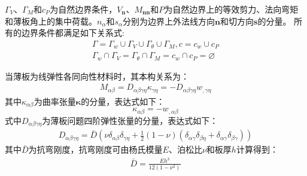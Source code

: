 $\Gamma_V$、$\Gamma_M$和$c_P$为自然边界条件，$V_{\boldsymbol n}$、$M_{\boldsymbol{nn}}$和$P$为自然边界上的等效剪力、法向弯矩和薄板角上的集中荷载。$n_\alpha$和$s_\alpha$分别为边界上外法线方向$\pmb{n}$和切方向$\pmb{s}$的分量。
所有的边界条件都满足如下关系式:
\begin{equation}\label{PGeometric relationships}
    \begin{split}
        \Gamma=\Gamma_w\cup\Gamma_V\cup\Gamma_{\theta}\cup\Gamma_M,c=c_w\cup c_P\\
        \Gamma_w\cap\Gamma_V=\Gamma_{\theta}\cap\Gamma_M=c_w\cap c_P=\varnothing
    \end{split}
\end{equation}\par
当薄板为线弹性各同向性材料时，其本构关系为：
\begin{equation}
    \begin{split}\label{Malphabeta}
        M_{\alpha\beta}=D_{\alpha\beta\gamma\eta}\kappa_{\gamma\eta}=-D_{\alpha\beta\gamma\eta}w_{,\gamma\eta}
    \end{split}
\end{equation}
其中$\kappa_{\alpha\beta}$为曲率张量$\pmb{\kappa}$的分量，表达式如下：
\begin{equation}\label{kappa}
    \kappa_{\alpha\beta}=-w_{,\alpha\beta}
\end{equation}
式中$D_{\alpha \beta \gamma \eta}$为薄板问题四阶弹性张量的分量，表达式如下：
\begin{equation}
    \begin{split}\label{Dalphabeta}
        D_{\alpha\beta\gamma\eta}=\bar D(\nu\delta_{\alpha\beta}\delta_{\gamma\eta}+\frac{1}{2}(1-\nu)(\delta_{\alpha\gamma}\delta_{\beta\eta}+\delta_{\alpha\gamma}\delta_{\beta\gamma}))
    \end{split}
\end{equation}
其中$\bar{D}$为抗弯刚度，抗弯刚度可由杨氏模量$E$、泊松比$\nu$和板厚$h$计算得到：
\begin{equation}\label{kangwangangdu}
    \begin{split}
    \bar D=\frac{Eh^3}{12(1-\nu^2)}
\end{split}
\end{equation}
\par

